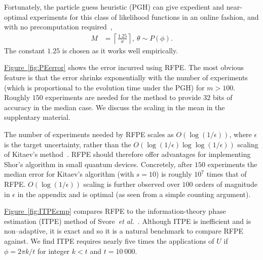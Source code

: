 \documentclass[aps,pra,amsmath,twocolumn,amssymb,superscriptaddress]{revtex4-1}
\newcommand{\app}[1]{the supplentary material}
\newcommand{\fig}[1]{\hyperref[fig:#1]{Figure~\ref*{fig:#1}}}
\newcommand{\etal}{\emph{et al.}}
\newcommand{\ee}{\mathrm{e}}
\begin{document}
Fortunately, the particle guess heuristic (PGH) can give
expedient and
near-optimal experiments for this class of likelihood
functions in an online fashion, and with no precomputation
required~\cite{wiebe_hamiltonian_2014},
\begin{align}
    M &= \left\lceil\frac{1.25}{\sigma}\right\rceil,~
    \theta \sim P(\phi).\label{eq:PGH}
\end{align}
The constant $1.25$ is chosen as it works well empirically.



\fig{PEerror} shows the error incurred using RFPE.  The most obvious feature is that the error shrinks exponentially with the number of experiments (which is proportional to the evolution time under the PGH) for $m>100$.  Roughly $150$ experiments are needed for the method to provide $32$ bits of accuracy in the median case.
We discuss the scaling in the mean in \app{var-reduction}.

The number of experiments needed by RFPE scales as $O(\log(1/\epsilon))$, where $\epsilon$ is the target uncertainty, rather than the $O(\log(1/\epsilon)\log\log(1/\epsilon))$ scaling of Kitaev's method~\cite{Kit96,kitaev2002classical}.  
 RFPE should therefore offer advantages for implementing Shor's algorithm in small quantum devices.
Concretely, after $150$ experiments the median error for Kitaev's algorithm (with $s=10$) is roughly $10^7$ times that of RFPE.  $O(\log(1/\epsilon))$ scaling  is further observed over $100$ orders of magnitude in $\epsilon$ in the appendix and is optimal (as seen from a simple counting argument).





\fig{ITPEcmp} compares RFPE to the information-theory phase estimation (ITPE) method of Svore~\etal~\cite{SHF14}.  Although ITPE is inefficient and is non--adaptive, it is exact and so it is a natural benchmark to compare RFPE against.  We find  ITPE requires nearly five times the applications of $U$ if $\phi=2\pi k/t$ for integer $k<t$ and $t=10~000$.
\end{document}
